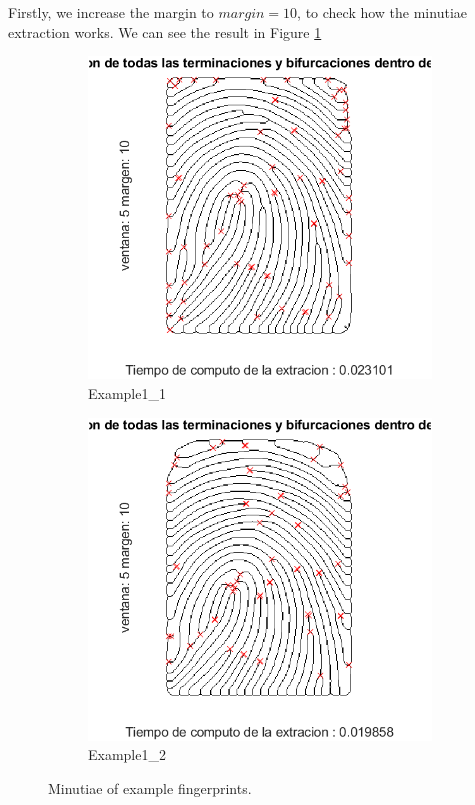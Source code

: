 \documentclass[a4paper]{article}
\begin{document}
Firstly, we increase the margin to \(margin = 10\), to check how the minutiae extraction works. We can see the result in Figure \ref{fig:ex5b}

\begin{figure}[H]
  \centering
       \begin{subfigure}[t]{0.45\textwidth}
         \centering
         \includegraphics[scale=0.7]{Figures/Minutiae1-m10}
         \caption{Example1\_1}
     \end{subfigure}%
     \quad
     \begin{subfigure}[t]{0.45\textwidth}
         \centering
         \includegraphics[scale=0.7]{Figures/Minutiae2-m10}
         \caption{Example1\_2}
     \end{subfigure}
    \caption{Minutiae of example fingerprints.}
    \label{fig:ex5b}
\end{figure}
\end{document}
